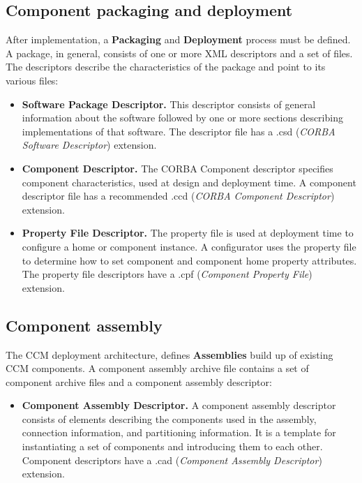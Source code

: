 \subsection{Component packaging and deployment}
After implementation, a {\bf Packaging} and {\bf Deployment} process must be 
defined. A package, in general, consists of one or more XML descriptors and 
a set of files. 
The descriptors describe the characteristics of the package and point to its 
various files:
\begin{itemize} 
\item {\bf Software Package Descriptor.}
This descriptor consists of general information about the software followed by 
one or more sections describing implementations of that software.
The descriptor file has a  .csd ({\it CORBA Software Descriptor}) extension.

\item {\bf Component Descriptor.}
The CORBA Component descriptor specifies component characteristics, used at 
design and deployment time. A component descriptor file has a recommended  .ccd 
({\it CORBA Component Descriptor}) extension.

\item {\bf Property File Descriptor.}
The property file is used at deployment time to configure a home or component 
instance. 
A configurator uses the property file to determine how to set component and 
component home property attributes.
The property file descriptors have a .cpf ({\it Component Property File}) 
extension.
\end{itemize}


\subsection{Component assembly}
The CCM deployment architecture, defines {\bf Assemblies} build up of 
existing CCM components.
A component assembly archive file contains a set of component archive files
and a component assembly descriptor: 

\begin{itemize} 
\item {\bf Component Assembly Descriptor.}
A component assembly descriptor consists of elements describing the components 
used in the assembly, connection information, and partitioning information.
It is a template for instantiating a set of components and introducing them 
to each other.
Component descriptors have a .cad  ({\it Component Assembly Descriptor}) 
extension.
\end{itemize}

